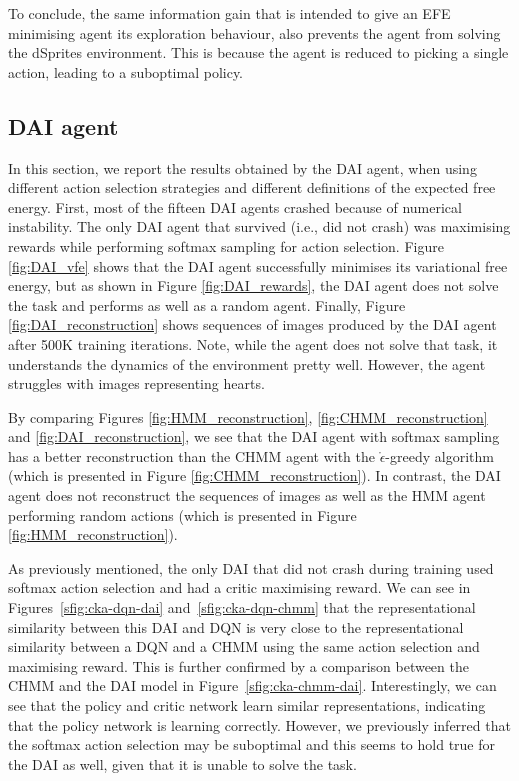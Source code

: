 \documentclass[twoside,11pt]{article}
\begin{document}
To conclude, the same information gain that is intended to give an EFE minimising agent its exploration behaviour, also prevents the agent from solving the dSprites environment. This is because the agent is reduced to picking a single action, leading to a suboptimal policy.

\subsection{DAI agent} \label{ssec:dai_results}

In this section, we report the results obtained by the DAI agent, when using different action selection strategies and different definitions of the expected free energy. First, most of the fifteen DAI agents crashed because of numerical instability. The only DAI agent that survived (i.e., did not crash) was maximising rewards while performing softmax sampling for action selection. Figure \ref{fig:DAI_vfe} shows that the DAI agent successfully minimises its variational free energy, but as shown in Figure \ref{fig:DAI_rewards}, the DAI agent does not solve the task and performs as well as a random agent. Finally, Figure \ref{fig:DAI_reconstruction} shows sequences of images produced by the DAI agent after 500K training iterations. Note, while the agent does not solve that task, it understands the dynamics of the environment pretty well. However, the agent struggles with images representing hearts.

By comparing Figures \ref{fig:HMM_reconstruction}, \ref{fig:CHMM_reconstruction} and \ref{fig:DAI_reconstruction}, we see that the DAI agent with softmax sampling has a better reconstruction than the CHMM agent with the $\mathring{\epsilon}$-greedy algorithm (which is presented in Figure \ref{fig:CHMM_reconstruction}). In contrast, the DAI agent does not reconstruct the sequences of images as well as the HMM agent performing random actions (which is presented in Figure \ref{fig:HMM_reconstruction}).

As previously mentioned, the only DAI that did not crash during training used softmax action selection and had a critic maximising reward. We can see in Figures~\ref{sfig:cka-dqn-dai} and~\ref{sfig:cka-dqn-chmm} that the representational similarity between this DAI and DQN is very close to the representational similarity between a DQN and a CHMM using the same action selection and maximising reward. This is further confirmed by a comparison between the CHMM and the DAI model in Figure~\ref{sfig:cka-chmm-dai}. Interestingly, we can see that the policy and critic network learn similar representations, indicating that the policy network is learning correctly. However, we previously inferred that the softmax action selection may be suboptimal and this seems to hold true for the DAI as well, given that it is unable to solve the task.
\end{document}
